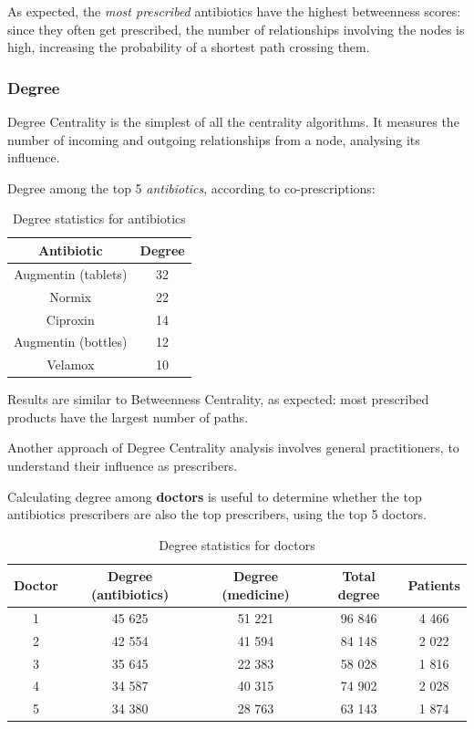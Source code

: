 As expected, the \textit{most prescribed} antibiotics have the highest betweenness scores: since they often get prescribed, the number of relationships involving the nodes is high, increasing the probability of a shortest path crossing them.

\subsubsection{Degree}
Degree Centrality is the simplest of all the centrality algorithms. It measures the number of incoming and outgoing relationships from a node, analysing its influence.

Degree among the top 5 \textit{antibiotics}, according to co-prescriptions:
\begin{table}[h]
	\centering
	\begin{tabular}{c|c}
		\textbf{Antibiotic} & \textbf{Degree} \\
		\hline
		Augmentin (tablets) & 32 \\
		\hline
		Normix & 22 \\
		\hline
		Ciproxin & 14 \\
		\hline
		Augmentin (bottles) & 12 \\
		\hline
		Velamox & 10 \\
	\end{tabular}
\caption{\small Degree statistics for antibiotics}
\end{table}

Results are similar to Betweenness Centrality, as expected: most prescribed products have the largest number of paths.

Another approach of Degree Centrality analysis involves general practitioners, to understand their influence as prescribers.

Calculating degree among \textbf{doctors} is useful to determine whether the top antibiotics prescribers are also the top prescribers, using the top 5 doctors.

\begin{table}[h]
	\centering
	\begin{tabular}{c|c|c|c|c}
		\textbf{Doctor} & \textbf{Degree (antibiotics)} & \textbf{Degree (medicine)} & \textbf{Total degree} & \textbf{Patients} \\
		\hline
		1 & 45 625 & 51 221 & 96 846 & 4 466 \\
		\hline
		2 & 42 554 & 41 594 & 84 148 & 2 022 \\
		\hline
		3 & 35 645 & 22 383 & 58 028 & 1 816 \\
		\hline
		4 & 34 587 & 40 315 & 74 902 & 2 028 \\
		\hline
		5 & 34 380 & 28 763 & 63 143 & 1 874
	\end{tabular}
\caption{\small Degree statistics for doctors}
\end{table}


